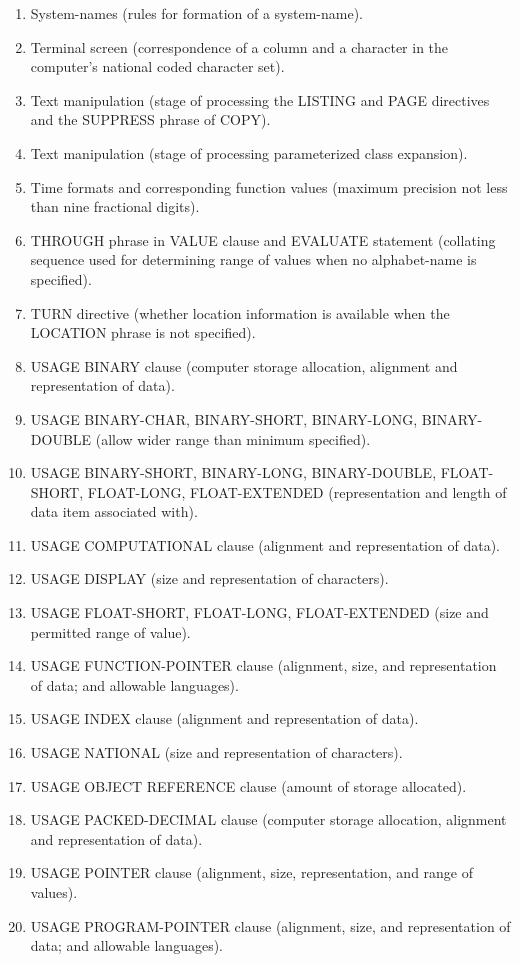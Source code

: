 \begin{enumerate}
\item System-names (rules for formation of a system-name).
\item Terminal screen (correspondence of a column and a character in the computer’s national coded character set).
\item Text manipulation (stage of processing the LISTING and PAGE directives and the SUPPRESS phrase of COPY).
\item Text manipulation (stage of processing parameterized class expansion).
\item Time formats and corresponding function values (maximum precision not less than nine fractional digits).
\item THROUGH phrase in VALUE clause and EVALUATE statement (collating sequence used for determining range
  of values when no alphabet-name is specified).
\item TURN directive (whether location information is available when the LOCATION phrase is not specified).
\item USAGE BINARY clause (computer storage allocation, alignment and representation of data).
\item USAGE BINARY-CHAR, BINARY-SHORT, BINARY-LONG, BINARY-DOUBLE (allow wider range than minimum
  specified).
\item USAGE BINARY-SHORT, BINARY-LONG, BINARY-DOUBLE, FLOAT-SHORT, FLOAT-LONG, FLOAT-EXTENDED (representation and length of data item associated with).
\item USAGE COMPUTATIONAL clause (alignment and representation of data).
\item USAGE DISPLAY (size and representation of characters).
\item USAGE FLOAT-SHORT, FLOAT-LONG, FLOAT-EXTENDED (size and permitted range of value).
\item USAGE FUNCTION-POINTER clause (alignment, size, and representation of data; and allowable languages).
\item USAGE INDEX clause (alignment and representation of data).
\item USAGE NATIONAL (size and representation of characters).
\item USAGE OBJECT REFERENCE clause (amount of storage allocated).
\item USAGE PACKED-DECIMAL clause (computer storage allocation, alignment and representation of data).
\item USAGE POINTER clause (alignment, size, representation, and range of values).
\item USAGE PROGRAM-POINTER clause (alignment, size, and representation of data; and allowable languages).

\end{enumerate}
